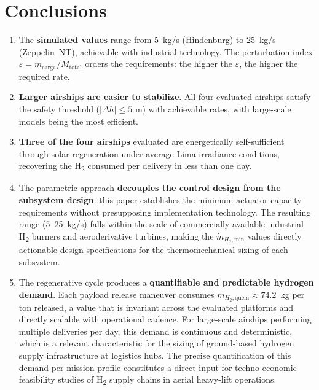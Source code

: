 \documentclass[aerospace,article,submit,pdftex,moreauthors]{Definitions/mdpi}
\newcommand{\dotmmin}{\dot{m}_{H_2,\text{min}}}
\begin{document}
\section{Conclusions}

\begin{enumerate}
\item The \textbf{simulated values} range from 5~kg/s (Hindenburg) to 25~kg/s (Zeppelin~NT), achievable with industrial technology. The perturbation index $\varepsilon = m_\text{carga}/M_\text{total}$ orders the requirements: the higher the $\varepsilon$, the higher the required rate.
\item \textbf{Larger airships are easier to stabilize}. All four evaluated airships satisfy the safety threshold ($|\Delta h| \le 5$ m) with achievable rates, with large-scale models being the most efficient.
\item \textbf{Three of the four airships} evaluated are energetically self-sufficient through solar regeneration under average Lima irradiance conditions, recovering the H\textsubscript{2} consumed per delivery in less than one day.
\item The parametric approach \textbf{decouples the control design from the subsystem design}: this paper establishes the minimum actuator capacity requirements without presupposing implementation technology. The resulting range (5--25~kg/s) falls within the scale of commercially available industrial H\textsubscript{2} burners and aeroderivative turbines, making the $\dotmmin$ values directly actionable design specifications for the thermomechanical sizing of each subsystem.
\item The regenerative cycle produces a \textbf{quantifiable and predictable hydrogen demand}. Each payload release maneuver consumes $m_{H_2,\text{quem}} \approx 74.2$~kg per ton released, a value that is invariant across the evaluated platforms and directly scalable with operational cadence. For large-scale airships performing multiple deliveries per day, this demand is continuous and deterministic, which is a relevant characteristic for the sizing of ground-based hydrogen supply infrastructure at logistics hubs. The precise quantification of this demand per mission profile constitutes a direct input for techno-economic feasibility studies of H\textsubscript{2} supply chains in aerial heavy-lift operations.
\end{enumerate}

\vspace{6pt}
\end{document}
